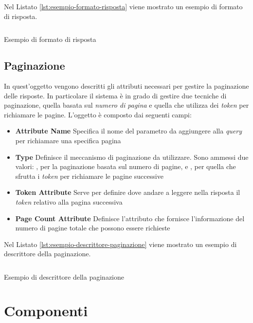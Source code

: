 Nel Listato \ref{lst:esempio-formato-risposta} viene mostrato un esempio di formato di risposta.

\begin{listing}[H]
	\inputminted{json}{5-implementazione-backend/Codice/esempio_formato_risposta.json}
	\caption{Esempio di formato di risposta}
	\label{lst:esempio-formato-risposta}
\end{listing}

\subsection{Paginazione\label{sec:descrittore-paginazione}}

In quest'oggetto vengono descritti gli attributi necessari per gestire la paginazione delle risposte. In particolare il sistema è in grado di gestire due tecniche di paginazione, quella basata sul \emph{numero di pagina} e quella che utilizza dei \emph{token} per richiamare le pagine. L'oggetto è composto dai seguenti campi:

\begin{itemize}
	\item \textbf{Attribute Name}
	Specifica il nome del parametro da aggiungere alla \emph{query} per richiamare una specifica pagina
	\item \textbf{Type}
	Definisce il meccanismo di paginazione da utilizzare. Sono ammessi due valori: , per la paginazione basata sul numero di pagine, e , per quella che sfrutta i \emph{token} per richiamare le pagine successive
	\item \textbf{Token Attribute}
	Serve per definire dove andare a leggere nella risposta il \emph{token} relativo alla pagina successiva
	\item \textbf{Page Count Attribute}
	Definisce l'attributo che fornisce l'informazione del numero di pagine totale che possono essere richieste
\end{itemize}

Nel Listato \ref{lst:esempio-descrittore-paginazione} viene mostrato un esempio di descrittore della paginazione.

\begin{listing}[H]
	\inputminted{json}{5-implementazione-backend/Codice/esempio_descrittore_paginazione.json}
	\caption{Esempio di descrittore della paginazione}
	\label{lst:esempio-descrittore-paginazione}
\end{listing}

\section{Componenti\label{sec:componenti-backend}}


